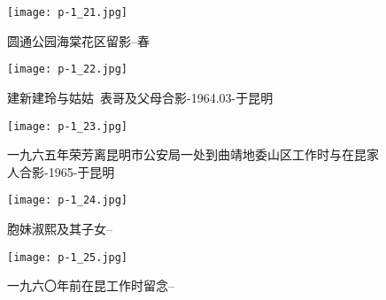 \clearpage


\begin{figure}
    \begin{center}
        \texttt{[image: p-1\_21.jpg]}
        \begin{shaded}
            \caption{圆通公园海棠花区留影--春}
        \end{shaded}
    \end{center}
\end{figure}

\clearpage


\begin{figure}
    \begin{center}
        \texttt{[image: p-1\_22.jpg]}
        \begin{shaded}
            \caption{建新建玲与姑姑~表哥及父母合影-1964.03-于昆明}
        \end{shaded}
    \end{center}
\end{figure}

\clearpage


\begin{figure}
    \begin{center}
        \texttt{[image: p-1\_23.jpg]}
        \begin{shaded}
            \caption{一九六五年荣芳离昆明市公安局一处到曲靖地委山区工作时与在昆家人合影-1965-于昆明}
        \end{shaded}
    \end{center}
\end{figure}

\clearpage


\begin{figure}
    \begin{center}
        \texttt{[image: p-1\_24.jpg]}
        \begin{shaded}
            \caption{胞妹淑熙及其子女--}
        \end{shaded}
    \end{center}
\end{figure}

\clearpage


\begin{figure}
    \begin{center}
        \texttt{[image: p-1\_25.jpg]}
        \begin{shaded}
            \caption{一九六〇年前在昆工作时留念--}
        \end{shaded}
    \end{center}
\end{figure}

